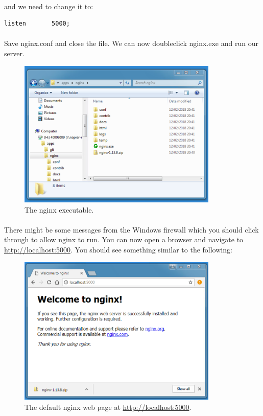 \documentclass[10pt, a4paper, twosize]{article}
\begin{document}
\paragraph{} and we need to change it to:

\begin{lstlisting}[style=DOS]
listen       5000;
\end{lstlisting}

\paragraph{} Save nginx.conf and close the file. We can now doubleclick nginx.exe and run our server. 

\begin{figure}[H]
\centering
\includegraphics[width=0.85\textwidth]{images/nginx_exe}
\caption{The nginx executable.}
\label{fig:nginx_welcome}
\end{figure}


\paragraph{} There might be some messages from the Windows firewall which you should click through to allow nginx to run. You can now open a browser and navigate to \url{http://localhost:5000}. You should see something similar to the following:

\begin{figure}[H]
\centering
\includegraphics[width=0.85\textwidth]{images/nginx_welcome}
\caption{The default nginx web page at \url{http://localhost:5000}.}
\label{fig:nginx_welcome}
\end{figure}
\end{document}
